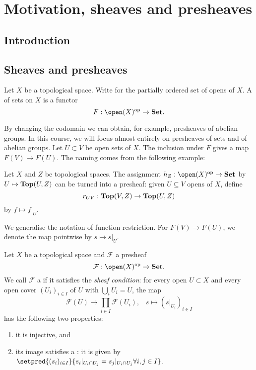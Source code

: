 \chapter{Motivation, sheaves and presheaves}

\section{Introduction}


\section{Sheaves and presheaves}

\begin{defn}
    Let $X$ be a topological space. Write  for the partially ordered set of opens of $X$.  A  of sets on $X$ is a functor
    \[
        F: \open(X)\opp \to \catSet. 
    \]  
\end{defn}
By changing the codomain we can obtain, for example, presheaves of abelian groups. In this course, we will focus almost entirely on presheaves of sets and of abelian groups.
Let $U \subset V $ be open sets of $X$. The inclusion under $F$ gives a  map $F(V) \to F(U)$. The naming comes from the following example: 

\begin{exmp}\label{exmp:ct-maps-presheaf}
    Let $X$ and $Z$ be topological spaces. The assignment $h_Z: \open(X)\opp \to \catSet$ by $U \mapsto \cont(U,Z)$ can be turned into a presheaf: given $U \subseteq V$ opens of $X$, define $$r_{UV}: \cont(V,Z) \to \cont(U,Z)$$ by $f \mapsto f|_U$.
\end{exmp}
We generalise the notation of function restriction. For $F(V) \to F(U)$, we denote the map pointwise by $s \mapsto s|_U$.

\begin{defn}\label{defn:sheaf}
    Let $X$ be a topological space and $\mathcal{F}$ a presheaf \[\mathcal{F}: \open(X)\opp \to \catSet. \] We call $\mathcal{F}$ a  if it satisfies the \emph{sheaf condition}:
    for every open $U \subset X$ and every open cover $(U_i)_{i \in I}$ of $U$ with $\bigcup_i U_i = U$, the map 
        \[
            \mathcal{F}(U) \to \prod_{i\in I}\mathcal{F}(U_i)\text{,} \quad s \mapsto (s|_{U_i})_{i \in I}
          \]
    has the following two properties:
    \begin{enumerate}
        \item\label{defn:sheaf:injective} it is injective, and
        \item\label{defn:sheaf:gluing} its image satisfies a : it is given by $\setpred{(s_i)_{i\in I}}{s_i |_{U_i \cap U_j} = s_j | _ {U_i \cap U_j} \forall i,j \in I}$.
    \end{enumerate}
\end{defn}

